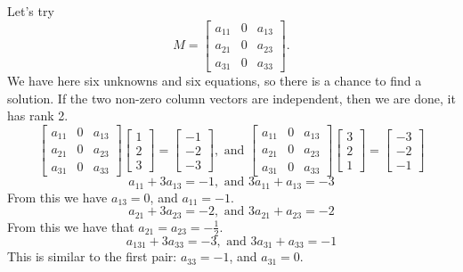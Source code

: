 Let's try
$$
M=\left[\begin{array}{ccc}a_{11}&0&a_{13}\\a_{21}&0&a_{23}\\a_{31}&0&a_{33}\end{array} \right].
$$
We have here six unknowns and six equations, so there is a chance to find a solution. If the two non-zero column vectors are independent, then we are done, it has rank 2.
$$
\left[\begin{array}{ccc}a_{11}&0&a_{13}\\a_{21}&0&a_{23}\\a_{31}&0&a_{33}\end{array} \right]\left[\begin{array}{c}1\\2\\3\end{array}\right]=\left[\begin{array}{c}-1\\-2\\-3\end{array}\right],\textrm{ and }
\left[\begin{array}{ccc}a_{11}&0&a_{13}\\a_{21}&0&a_{23}\\a_{31}&0&a_{33}\end{array} \right]\left[\begin{array}{c}3\\2\\1\end{array}\right]=\left[\begin{array}{c}-3\\-2\\-1\end{array}\right]
$$
$$
a_{11}+3a_{13}=-1,\textrm{ and }3a_{11}+a_{13}=-3
$$
From this we have $a_{13}=0$, and $a_{11}=-1$.
$$
a_{21}+3a_{23}=-2,\textrm{ and }3a_{21}+a_{23}=-2
$$
From this we have that $a_{21}=a_{23}=-\frac{1}{2}$.
$$
a_{131}+3a_{33}=-3,\textrm{ and }3a_{31}+a_{33}=-1
$$
This is similar to the first pair: $a_{33}=-1$, and $a_{31}=0$.

